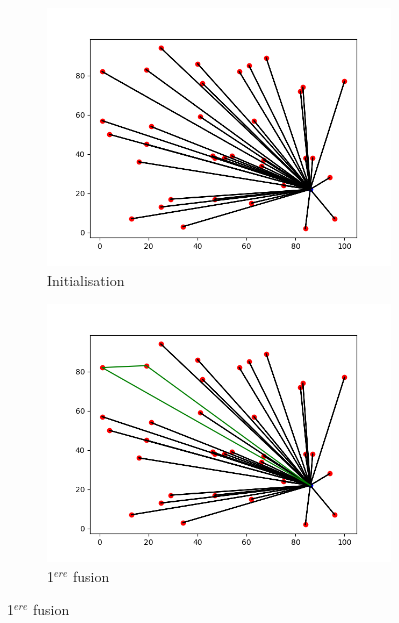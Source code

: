 \documentclass[a4paper,11pt]{article}%
\begin{document}
\begin{figure}

  	\begin{figure}
  	\includegraphics[scale=0.2]{CWinit.png}
  	\caption{Initialisation}
  	\end{figure}
	
  
  	\begin{figure}
	\includegraphics[scale=0.2]{CW1.png}
	\caption{1$^{ere}$ fusion}
  	\end{figure}
  	


\end{figure}
\end{document}
